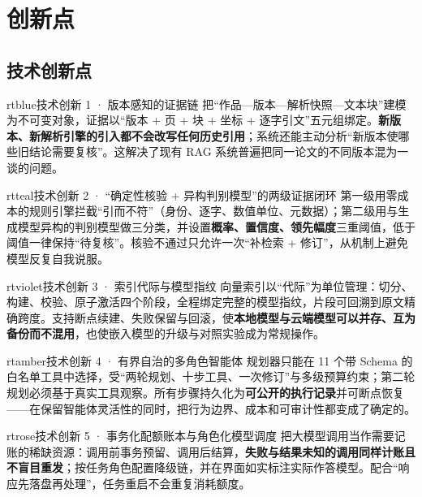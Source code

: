 \section{创新点}\label{sec:innovation}

\subsection{技术创新点}

\begin{innobox}{rtblue}{技术创新 1 · 版本感知的证据链}
把“作品—版本—解析快照—文本块”建模为不可变对象，证据以“版本 + 页 + 块 + 坐标 + 逐字引文”五元组绑定。\textbf{新版本、新解析引擎的引入都不会改写任何历史引用}；系统还能主动分析“新版本使哪些旧结论需要复核”。这解决了现有 RAG 系统普遍把同一论文的不同版本混为一谈的问题。
\end{innobox}

\begin{innobox}{rtteal}{技术创新 2 · “确定性核验 + 异构判别模型”的两级证据闭环}
第一级用零成本的规则引擎拦截“引而不符”（身份、逐字、数值单位、元数据）；第二级用与生成模型异构的判别模型做三分类，并设置\textbf{概率、置信度、领先幅度}三重阈值，低于阈值一律保持“待复核”。核验不通过只允许一次“补检索 + 修订”，从机制上避免模型反复自我说服。
\end{innobox}

\begin{innobox}{rtviolet}{技术创新 3 · 索引代际与模型指纹}
向量索引以“代际”为单位管理：切分、构建、校验、原子激活四个阶段，全程绑定完整的模型指纹，片段可回溯到原文精确跨度。支持断点续建、失败保留与回滚，使\textbf{本地模型与云端模型可以并存、互为备份而不混用}，也使嵌入模型的升级与对照实验成为常规操作。
\end{innobox}

\begin{innobox}{rtamber}{技术创新 4 · 有界自治的多角色智能体}
规划器只能在 11 个带 Schema 的白名单工具中选择，受“两轮规划、十步工具、一次修订”与多级预算约束；第二轮规划必须基于真实工具观察。所有步骤持久化为\textbf{可公开的执行记录}并可断点恢复——在保留智能体灵活性的同时，把行为边界、成本和可审计性都变成了确定的。
\end{innobox}

\begin{innobox}{rtrose}{技术创新 5 · 事务化配额账本与角色化模型调度}
把大模型调用当作需要记账的稀缺资源：调用前事务预留、调用后结算，\textbf{失败与结果未知的调用同样计账且不盲目重发}；按任务角色配置降级链，并在界面如实标注实际作答模型。配合“响应先落盘再处理”，任务重启不会重复消耗额度。
\end{innobox}

